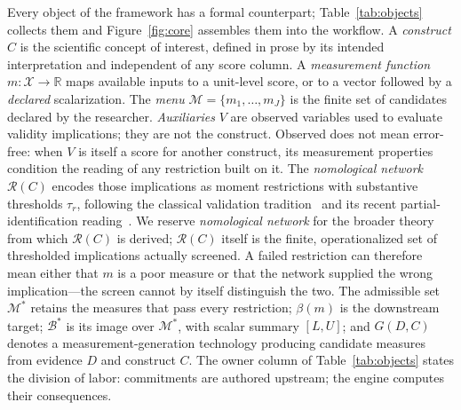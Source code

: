 \documentclass[10pt,letterpaper]{article}
\newcommand{\M}{\ensuremath{\mathcal{M}}}
\newcommand{\Rset}{\mathcal{R}}
\newcommand{\Bset}{\mathcal{B}}
\begin{document}
Every object of the framework has a formal counterpart; Table~\ref{tab:objects} collects them and Figure~\ref{fig:core} assembles them into the workflow.
A \emph{construct} $C$ is the scientific concept of interest, defined in prose by its intended interpretation and independent of any score column.
A \emph{measurement function} $m:\mathcal{X}\to\mathbb{R}$ maps available inputs to a unit-level score, or to a vector followed by a \emph{declared} scalarization.
The \emph{menu} $\M=\{m_1,\ldots,m_J\}$ is the finite set of candidates declared by the researcher.
\emph{Auxiliaries} $V$ are observed variables used to evaluate validity implications; they are not the construct.
Observed does not mean error-free: when $V$ is itself a score for another construct, its measurement properties condition the reading of any restriction built on it.
The \emph{nomological network} $\Rset(C)$ encodes those implications as moment restrictions with substantive thresholds $\tau_r$, following the classical validation tradition~\cite{cronbach1955,campbell1959} and its recent partial-identification reading~\cite{dellrambachan2026}.
We reserve \emph{nomological network} for the broader theory from which $\Rset(C)$ is derived; $\Rset(C)$ itself is the finite, operationalized set of thresholded implications actually screened.
A failed restriction can therefore mean either that $m$ is a poor measure or that the network supplied the wrong implication---the screen cannot by itself distinguish the two.
The admissible set $\M^*$ retains the measures that pass every restriction; $\beta(m)$ is the downstream target; $\Bset^*$ is its image over $\M^*$, with scalar summary $[L,U]$; and $G(D,C)$ denotes a measurement-generation technology producing candidate measures from evidence $D$ and construct $C$.
The owner column of Table~\ref{tab:objects} states the division of labor: commitments are authored upstream; the engine computes their consequences.
\end{document}
